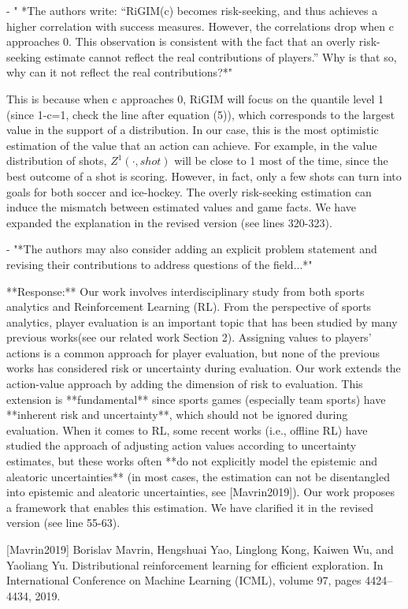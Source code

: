 \documentclass{article}
\begin{document}
- " *The authors write: “RiGIM(c) becomes risk-seeking, and thus achieves a higher correlation with success measures. However, the correlations drop when c approaches 0. This observation is consistent with the fact that an overly risk-seeking estimate cannot reflect the real contributions of players.” Why is that so, why can it not reflect the real contributions?*"

This is because when c approaches 0, RiGIM will focus on the quantile level 1 (since 1-c=1, check the line after equation (5)), which corresponds to the largest value in the support of a distribution. In our case, this is the most optimistic estimation of the value that an action can achieve. For example, in the value distribution of shots, $Z^{1}(\cdot,shot)$ will be close to 1 most of the time, since the best outcome of a shot is scoring. However, in fact, only a few shots can turn into goals for both soccer and ice-hockey. The overly risk-seeking estimation can induce the mismatch between estimated values and game facts. We have expanded the explanation in the revised version (see lines 320-323).

- "*The authors may also consider adding an explicit problem statement and revising their contributions to address questions of the field...*"

**Response:**  Our work involves interdisciplinary study from both sports analytics and Reinforcement Learning (RL). From the perspective of sports analytics, player evaluation is an important topic that has been studied by many previous works(see our related work Section 2). Assigning values to players' actions is a common approach for player evaluation, but none of the previous works has considered risk or uncertainty during evaluation. Our work extends the action-value approach by adding the dimension of risk to evaluation. This extension is **fundamental** since sports games (especially team sports) have **inherent risk and uncertainty**, which should not be ignored during evaluation. When it comes to RL, some recent works (i.e., offline RL) have studied the approach of adjusting action values according to uncertainty estimates, but these works often **do not explicitly model the epistemic and aleatoric uncertainties** (in most cases, the estimation can not be disentangled into epistemic and aleatoric uncertainties, see [Mavrin2019]). Our work proposes a framework that enables this estimation. We have clarified it in the revised version (see line 55-63).

[Mavrin2019] Borislav Mavrin, Hengshuai Yao, Linglong Kong, Kaiwen Wu, and Yaoliang Yu. Distributional reinforcement learning for efficient exploration. In International Conference on Machine Learning (ICML), volume 97, pages 4424–4434, 2019.
\end{document}
